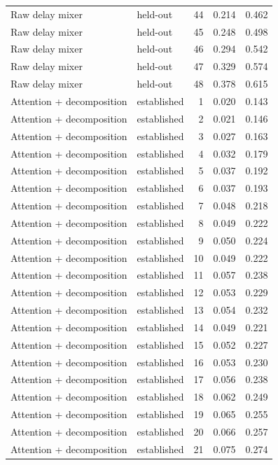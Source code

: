 \begin{tabular}{llrrr}
Raw delay mixer & held-out & 44 & 0.214 & 0.462 \\
Raw delay mixer & held-out & 45 & 0.248 & 0.498 \\
Raw delay mixer & held-out & 46 & 0.294 & 0.542 \\
Raw delay mixer & held-out & 47 & 0.329 & 0.574 \\
Raw delay mixer & held-out & 48 & 0.378 & 0.615 \\
Attention + decomposition & established & 1 & 0.020 & 0.143 \\
Attention + decomposition & established & 2 & 0.021 & 0.146 \\
Attention + decomposition & established & 3 & 0.027 & 0.163 \\
Attention + decomposition & established & 4 & 0.032 & 0.179 \\
Attention + decomposition & established & 5 & 0.037 & 0.192 \\
Attention + decomposition & established & 6 & 0.037 & 0.193 \\
Attention + decomposition & established & 7 & 0.048 & 0.218 \\
Attention + decomposition & established & 8 & 0.049 & 0.222 \\
Attention + decomposition & established & 9 & 0.050 & 0.224 \\
Attention + decomposition & established & 10 & 0.049 & 0.222 \\
Attention + decomposition & established & 11 & 0.057 & 0.238 \\
Attention + decomposition & established & 12 & 0.053 & 0.229 \\
Attention + decomposition & established & 13 & 0.054 & 0.232 \\
Attention + decomposition & established & 14 & 0.049 & 0.221 \\
Attention + decomposition & established & 15 & 0.052 & 0.227 \\
Attention + decomposition & established & 16 & 0.053 & 0.230 \\
Attention + decomposition & established & 17 & 0.056 & 0.238 \\
Attention + decomposition & established & 18 & 0.062 & 0.249 \\
Attention + decomposition & established & 19 & 0.065 & 0.255 \\
Attention + decomposition & established & 20 & 0.066 & 0.257 \\
Attention + decomposition & established & 21 & 0.075 & 0.274 \\

\end{tabular}

